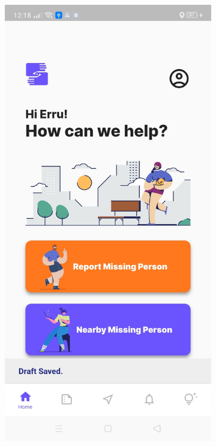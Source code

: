 \begin{figure}[!h]
\begin{subfigure}[c]{0.30\linewidth}
    \end{subfigure}
    \centering
    \begin{subfigure}[c]{0.30\linewidth}
        \centering
        \includegraphics[scale=0.15]{figures/Chapter4/Main/draftSaved.jpg}

\end{subfigure}
\end{figure}
